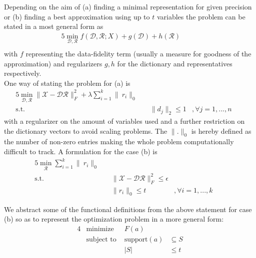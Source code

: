 \documentclass{article}
\newcommand{\R}{\mathbb{R}}
\DeclareMathOperator*{\argmin}{\arg\!\min}
\begin{document}
\noindent Depending on the aim of (a) finding a minimal representation for given precision or (b) finding a best approximation using up to $t$ variables the problem can be stated in a most general form as
\begin{alignat*}{5}
          \min_{\mathcal{D}, \mathcal{R}}  f(\mathcal{D}, \mathcal{R}; X) + g(\mathcal{D}) + h(\mathcal{R})      & \quad  & \\
\end{alignat*}
with $f$ representing the data-fidelity term (usually a measure for goodness of the approximation) and regularizers $g, h$ for the dictionary and representatives respectively.
\\
One way of stating the problem for (a) is
\begin{alignat}{5}
          \min_{\mathcal{D}, \mathcal{R}} \|\mathcal{X}-\mathcal{D}\mathcal{R}\|_F^2  + \lambda \sum_{i=1}^k  \|\ r_i\|_0    & \quad  & \\
         \text{s.t.} & \quad  \|d_j\|_2 \leq 1&, \forall j=1, ...,n & \quad 
\end{alignat}
with a regularizer on the amount of variables used and a further restriction on the dictionary vectors to avoid scaling problems. The $\| .\|_0$ is hereby defined as the number of non-zero entries making the whole problem computationally difficult to track. A formulation for the case (b) is 
\begin{alignat}{5}
          \min_{\mathcal{R}} \sum_{i=1}^k  \|\ r_i\|_0    & \quad  & \\
         \text{s.t.} & \quad  \|\mathcal{X}-\mathcal{D}\mathcal{R}\|_F^2 \leq \epsilon & & \quad \\
          & \quad  \| r_i \|_0 \leq t  &, \forall i=1, ..., k & \quad 
\end{alignat}


\noindent We abstract some of the functional definitions from the above statement for case (b) so as to represent the optimization problem in a more general form:
\begin{alignat*}{4}
    &\text{minimize }   & F(a) & \\
    &\text{subject to } & \text{support}(a)&\subseteq S\\
    &                   & |S|  &\leq t\\
\end{alignat*}
	
\end{document}

